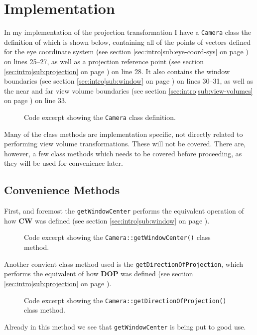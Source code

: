 \documentclass[11pt]{article}
\newcommand{\secref}[1]{see section \ref{#1} on page \pageref{#1}}
\newcommand{\code}[1]{{\tt #1}}
\begin{document}
\newpage
\section{Implementation}
\label{sec:implementation}
In my implementation of the projection transformation I have a \code{Camera}
class the definition of which is shown below, containing all of the points of
vectors defined for the eye coordinate system
(\secref{sec:intro|sub:eye-coord-sys}) on lines 25--27, as well as a
projection reference point (\secref{sec:intro|sub:projection}) on line 28. It
also contains the window boundaries (\secref{sec:intro|sub:window}) on lines
30--31, as well as the near and far view volume boundaries
(\secref{sec:intro|sub:view-volumes}) on line 33.
\begin{figure}[H]
    
    \caption{Code excerpt showing the \code{Camera} class definition.}
    \label{code:camera-definition}
\end{figure}
Many of the class methods are implementation specific, not directly related to
performing view volume transformations. These will not be covered. There are,
however, a few class methods which needs to be covered before proceeding, as
they will be used for convenience later.

\subsection{Convenience Methods}
First, and foremost the \code{getWindowCenter} performs the equivalent
operation of how {\bf CW} was defined (\secref{sec:intro|sub:window}).
\begin{figure}[H]
    
    \caption{Code excerpt showing the \code{Camera::getWindowCenter()} class
    method.}
    \label{code:get-window-center}
\end{figure}

Another convient class method used is the \code{getDirectionOfProjection},
which performs the equivalent of how {\bf DOP} was defined
(\secref{sec:intro|sub:projection}).
\begin{figure}[H]
    
    \caption{Code excerpt showing the
    \code{Camera::getDirectionOfProjection()} class method.}
    \label{code:get-direction-of-projection}
\end{figure}
Already in this method we see that \code{getWindowCenter} is being put to
good use.
\end{document}
